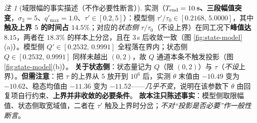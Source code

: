 \documentclass[11pt]{article}
\theoremstyle{remark}\newtheorem{remark}{注}
\begin{document}
\begin{remark}[域限幅的事实描述（不作必要性断言）]\label{rem:proj-fact}
实测（\textbf{$T_{\rm end}=10$\,s、三段幅值突变}，$\sigma_2=5$、$q'_{\max}=1.0$、$\tau'\in[0.2,5]$）：模型侧 $\tau'/\tau_0\in[0.2168,\,5.0000]$，其中\textbf{触及上界 $5$ 的时间占 $14.5\%$}；对应的\emph{状态侧} $\tau/\tau_0$（不设上界）在同工况下\textbf{峰值达 $8.15$}，两者在 $18.3\%$ 的样本上分岔，且在 $3$\,s 后收敛一致（图 \ref{fig:state-model}(a)）。模型侧 $Q'\in[0.2532,\,0.9991]$ 全程落在界内；状态侧 $Q\in[0.2532,\,0.9991]$ 同样未越出 $(0,2)$，故 $Q$ 通道本条不触发投影（图 \ref{fig:state-model}(b)）。
\textbf{关于状态侧}：状态量记为 $Q$（限 $(0,2)$）与 $\tau$（\emph{不设}上界）。\textbf{但需注意}：把 $\tau$ 的上界从 $5$ 放开到 $10^{6}$ 后，实测 $\theta$ 末值由 $-10.49$ 变为 $-10.62$、稳态均值由 $-11.36$ 变为 $-11.52$——\emph{几乎不变}，说明在该参数下 $\theta$ 由回复项自行约束、\textbf{上界并非收敛的必要条件}。
\textbf{故本注只陈述事实}：模型侧取限幅值、状态侧取宽域值，二者在 $\tau'$ 触及上界时分岔；\emph{不对“投影是否必要”作一般性断言}。
\end{remark}
\end{document}
